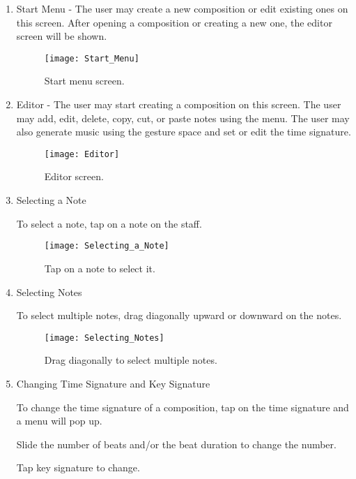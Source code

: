 \begin{enumerate}

\item Start Menu - The user may create a new composition or edit existing ones on this screen. After opening a composition or creating a new one, the editor screen will be shown.

\begin{figure}[H]
	\centering
	\texttt{[image: Start\_Menu]}
    \label{fig:startmenu}
    \caption{Start menu screen.}
\end{figure}

\item Editor - The user may start creating a composition on this screen. The user may add, edit, delete, copy, cut, or paste notes using the menu. The user may also generate music using the gesture space and set or edit the time signature.

\begin{figure}[H]
	\centering
	\texttt{[image: Editor]}
    \label{fig:editor}
    \caption{Editor screen.}
\end{figure}

\item Selecting a Note

To select a note, tap on a note on the staff.

\begin{figure}[H]
	\centering
	\texttt{[image: Selecting\_a\_Note]}
    \label{fig:select-note}
    \caption{Tap on a note to select it.}
\end{figure}

\item Selecting Notes

To select multiple notes, drag diagonally upward or downward on the notes.

\begin{figure}[H]
	\centering
	\texttt{[image: Selecting\_Notes]}
    \label{fig:select-notes}
    \caption{Drag diagonally to select multiple notes.}
\end{figure}

\item Changing Time Signature and Key Signature

To change the time signature of a composition, tap on the time signature and a menu will pop up.

Slide the number of beats and/or the beat duration to change the number.

Tap key signature to change.


\end{enumerate}
